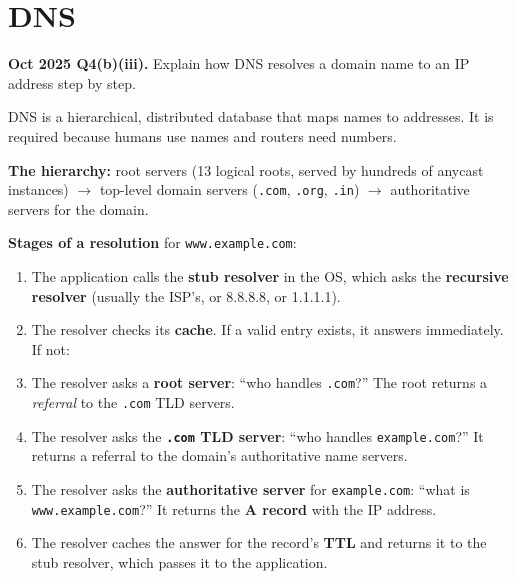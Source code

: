 \documentclass[11pt,a4paper]{article}
\begin{document}
\section{DNS}

\begin{pyqbox}
\textbf{Oct 2025 Q4(b)(iii).} Explain how DNS resolves a domain name to an IP address step by step.
\end{pyqbox}

\begin{solbox}
DNS is a hierarchical, distributed database that maps names to addresses. It is required because humans use names and routers need numbers.

\textbf{The hierarchy:} root servers (13 logical roots, served by hundreds of anycast instances) $\rightarrow$ top-level domain servers (\texttt{.com}, \texttt{.org}, \texttt{.in}) $\rightarrow$ authoritative servers for the domain.

\textbf{Stages of a resolution} for \texttt{www.example.com}:

\begin{enumerate}
\item The application calls the \textbf{stub resolver} in the OS, which asks the \textbf{recursive resolver} (usually the ISP's, or 8.8.8.8, or 1.1.1.1).
\item The resolver checks its \textbf{cache}. If a valid entry exists, it answers immediately. If not:
\item The resolver asks a \textbf{root server}: ``who handles \texttt{.com}?'' The root returns a \emph{referral} to the \texttt{.com} TLD servers.
\item The resolver asks the \textbf{\texttt{.com} TLD server}: ``who handles \texttt{example.com}?'' It returns a referral to the domain's authoritative name servers.
\item The resolver asks the \textbf{authoritative server} for \texttt{example.com}: ``what is \texttt{www.example.com}?'' It returns the \textbf{A record} with the IP address.
\item The resolver caches the answer for the record's \textbf{TTL} and returns it to the stub resolver, which passes it to the application.
\end{enumerate}


\end{solbox}
\end{document}
